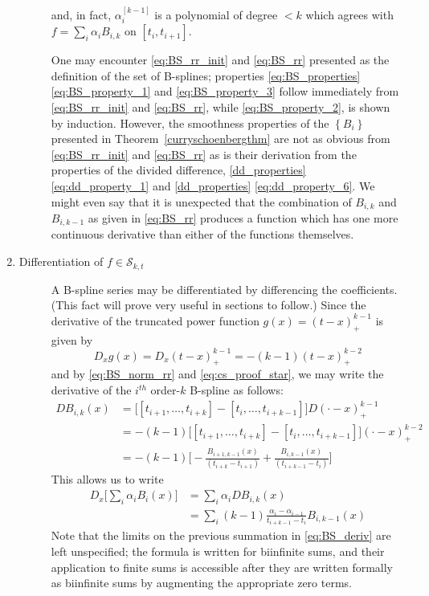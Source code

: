 \documentclass[12pt]{article}
\theoremstyle{definition}
\begin{document}
\begin{enumerate}
\begin{description}
and, in fact, $\alpha_i^{\left[k-1\right]}$ is a polynomial of degree $< k$ which agrees with $f = \sum_i \alpha_i B_{i,k}$ on $\left[t_i,t_{i+1}\right]$. 

One may encounter \ref{eq:BS_rr_init} and \ref{eq:BS_rr} presented as the definition of the set of B-splines; properties \ref{eq:BS_properties} \ref{eq:BS_property_1} and \ref{eq:BS_property_3} follow immediately from \ref{eq:BS_rr_init} and \ref{eq:BS_rr}, while  \ref{eq:BS_property_2}, is shown by induction. However, the smoothness properties of the $\left\{ B_i \right\}$ presented in Theorem~\ref{curryschoenbergthm} are not as obvious from \ref{eq:BS_rr_init} and \ref{eq:BS_rr} as is their derivation from the properties of the divided difference, \ref{dd_properties} \ref{eq:dd_property_1} and \ref{dd_properties} \ref{eq:dd_property_6}. We might even say that it is unexpected that the combination of $B_{i,k}$ and $B_{i,k-1}$ as given in \ref{eq:BS_rr} produces a function which has one more continuous derivative than either of the functions themselves. 


\end{description}
\item \label{eq:BS_deriv_property} \begin{description}\item[Differentiation of $f \in \mathscr{S}_{k,t}$] 

A B-spline series may be differentiated by differencing the coefficients. (This fact will prove very useful in sections to follow.) Since the derivative of the truncated power function $g\left(x\right) = \left(t-x\right)_+^{k-1}$ is given by 
\[
D_x g\left(x\right) = D_x \left(t-x\right)_+^{k-1} = -\left(k-1\right)\left(t-x\right)_+^{k-2}
\]
and by \ref{eq:BS_norm_rr} and \ref{eq:cs_proof_star}, we may write the derivative of the $i^{th}$ order-$k$ B-spline as follows:
\begin{align*}
DB_{i,k}\left(x\right) &= \bigg[ \left[ t_{i+1},\dots,t_{i+k} \right] -\left[ t_{i},\dots,t_{i+k-1} \right] \bigg] D\left(\cdot - x\right)_+^{k-1}\\
&= -\left(k-1\right) \bigg[ \left[ t_{i+1},\dots,t_{i+k} \right] -\left[ t_{i},\dots,t_{i+k-1} \right] \bigg] \left( \cdot - x \right)^{k-2}_+ \\
&= -\left(k-1\right) \bigg[ -\frac{B_{i+1,k-1}\left(x\right)}{\left(t_{i+k} - t_{i+1} \right)}  + \frac{B_{i,k-1}\left(x\right)}{\left(t_{i+k-1} - t_{i} \right)} \bigg]  
\end{align*}
This allows us to write 
\begin{align} 
D_x \bigg[ \sum_{i} \alpha_i B_i\left(x\right) \bigg] &=  \sum_i \alpha_i D B_{i,k} \left(x\right)\nonumber \\
&= \sum_i \left(k-1\right) \frac{\alpha_i - \alpha_{i-1}}{t_{i+k-1}-t_i}B_{i,k-1}\left(x\right) \label{eq:BS_deriv}
\end{align}  
Note that the limits on the previous summation in \ref{eq:BS_deriv} are left unspecified; the formula is written for biinfinite sums, and their application to finite sums is accessible after they are written formally as biinfinite sums by augmenting the appropriate zero terms. 


\end{description}
\end{enumerate}
\end{document}
